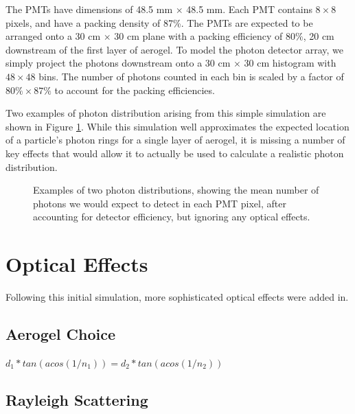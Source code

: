 The PMTs have dimensions of 48.5 mm $\times$ 48.5 mm.
Each PMT contains $8 \times 8$ pixels, and have a packing density of 87\%. 
The PMTs are expected to be arranged onto a 30 cm $\times$ 30 cm plane with a packing efficiency of $80\%$, 20 cm downstream of the first layer of aerogel.
To model the photon detector array, we simply project the photons downstream onto a 30 cm $\times$ 30 cm histogram with $48 \times 48$ bins.
The number of photons counted in each bin is scaled by a factor of $80\% \times 87\%$ to account for the packing efficiencies.

Two examples of photon distribution arising from this simple simulation are shown in Figure \ref{fig:noScat}. While this simulation well approximates the expected location of a particle's photon rings for a single layer of aerogel, it is missing a number of key effects that would allow it to actually be used to calculate a realistic photon distribution.


\begin{figure}[]
  \centering
  \hfill
  \caption{ Examples of two photon distributions, showing the mean number of photons we would expect to detect in each PMT pixel, after accounting for detector efficiency, but ignoring any optical effects. }
  \label{fig:noScat}
\end{figure}

\section{Optical Effects}
Following this initial simulation, more sophisticated optical effects were added in. 

\subsection{Aerogel Choice}

$d_1*tan(acos(1/n_1)) = d_2*tan(acos(1/n_2)) $

\subsection{Rayleigh Scattering}

